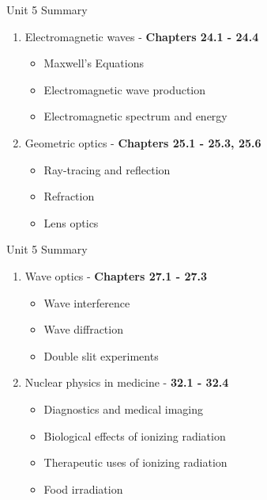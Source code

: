 \documentclass{beamer}
\begin{document}
\begin{frame}{Unit 5 Summary}
\begin{enumerate}
\item Electromagnetic waves - \textbf{Chapters 24.1 - 24.4}
\begin{itemize}
\item Maxwell's Equations
\item Electromagnetic wave production
\item Electromagnetic spectrum and energy
\end{itemize}
\item Geometric optics - \textbf{Chapters 25.1 - 25.3, 25.6}
\begin{itemize}
\item Ray-tracing and reflection
\item Refraction
\item Lens optics
\end{itemize}
\end{enumerate}
\end{frame}

\begin{frame}{Unit 5 Summary}
\begin{enumerate}
\item Wave optics - \textbf{Chapters 27.1 - 27.3}
\begin{itemize}
\item Wave interference
\item Wave diffraction
\item Double slit experiments
\end{itemize}
\item Nuclear physics in medicine - \textbf{32.1 - 32.4}
\begin{itemize}
\item Diagnostics and medical imaging
\item Biological effects of ionizing radiation
\item Therapeutic uses of ionizing radiation
\item Food irradiation
\end{itemize}
\end{enumerate}
\end{frame}
\end{document}
